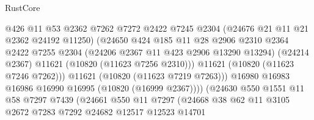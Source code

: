 \begin{lexlean}{RustCore}
\begin{coremodule}
                                      @426
                                      @11
                                      @53
                                      @2362
                                      @7262
                                      @7272
                                      @2422
                                      @7245
                                      @2304
                                      (@24676 @21 @11 @21 @2362 @24192 @11250)
                                      (@24650
                                        @424
                                        @185
                                        @11
                                        @28
                                        @2906
                                        @2310
                                        @2364
                                        @2422
                                        @7255
                                        @2304
                                        (@24206 @2367 @11 @423 @2906 @13290 @13294)
                                        (@24214 @2367)
                                        @11621
                                        (@10820 (@11623 @7256 @2310)))
                                      @11621
                                      (@10820 (@11623 @7246 @7262)))
                                    @11621
                                    (@10820 (@11623 @7219 @7263)))
                                  @16980
                                  @16983
                                  @16986
                                  @16990
                                  @16995
                                  (@10820 (@16999 @2367))))
                              (@24630
                                @550
                                @1551
                                @11
                                @58
                                @7297
                                @7439
                                (@24661
                                  @550
                                  @11
                                  @7297
                                  (@24668
                                    @38
                                    @62
                                    @11
                                    @3105
                                    @2672
                                    @7283
                                    @7292
                                    @24682
                                    @12517
                                    @12523
                                    @14701

\end{coremodule}
\end{lexlean}
